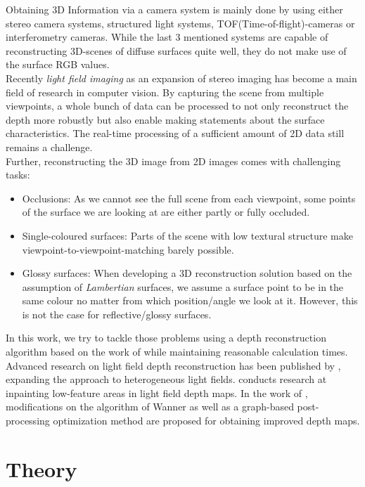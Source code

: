 \documentclass  [
  paper    = a4,
  BCOR     = 10mm,
  twoside,
  fontsize = 12pt,
  fleqn,
  toc      = bibnumbered,
  toc      = listofnumbered,
  numbers  = noendperiod,
  headings = normal,
  listof   = leveldown,
  version  = 3.03
]                                       {scrreprt}
\begin{document}
Obtaining 3D Information via a camera system is mainly done by using either stereo camera systems, structured light systems, TOF(Time-of-flight)-cameras or interferometry cameras. While the last 3 mentioned systems are capable of reconstructing 3D-scenes of diffuse surfaces quite well, they do not make use of the surface RGB values.\\
Recently \textit{light field imaging} as an expansion of stereo imaging has become a main field of research in computer vision. By capturing the scene from multiple viewpoints, a whole bunch of data can be processed to not only reconstruct the depth more robustly but also enable making statements about the surface characteristics. The real-time processing of a sufficient amount of 2D data still remains a challenge. \\
Further, reconstructing the 3D image from 2D images comes with challenging tasks:
\begin{itemize}
	\item Occlusions: As we cannot see the full scene from each viewpoint, some points of the surface we are looking at are either partly or fully occluded.
	\item Single-coloured surfaces: Parts of the scene with low textural structure make viewpoint-to-viewpoint-matching barely possible.
	\item Glossy surfaces: When developing a 3D reconstruction solution based on the assumption of \textit{Lambertian} surfaces, we assume a surface point to be in the same colour no matter from which position/angle we look at it. However, this is not the case for reflective/glossy surfaces.
\end{itemize}
In this work, we try to tackle those problems using a depth reconstruction algorithm based on the work of \cite{wanner2014orientation} while maintaining reasonable calculation times.\\
Advanced research on light field depth reconstruction has been published by \cite{diebold2016light}, expanding the approach to heterogeneous light fields. \cite{schoenpflug2017optimizing} conducts research at inpainting low-feature areas in light field depth maps. In the work of \cite{freist2018reconst}, modifications on the algorithm of Wanner as well as a graph-based post-processing optimization method are proposed for obtaining improved depth maps.\\
\chapter{Theory}\label{chapter_theory}
\end{document}
